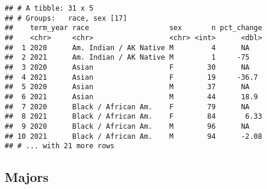 \documentclass[]{article}
\newenvironment{Shaded}{\begin{snugshade}}{\end{snugshade}}
\newcommand{\CommentTok}[1]{\textcolor[rgb]{0.56,0.35,0.01}{\textit{#1}}}
\newcommand{\DataTypeTok}[1]{\textcolor[rgb]{0.13,0.29,0.53}{#1}}
\newcommand{\DecValTok}[1]{\textcolor[rgb]{0.00,0.00,0.81}{#1}}
\newcommand{\KeywordTok}[1]{\textcolor[rgb]{0.13,0.29,0.53}{\textbf{#1}}}
\newcommand{\NormalTok}[1]{#1}
\newcommand{\OperatorTok}[1]{\textcolor[rgb]{0.81,0.36,0.00}{\textbf{#1}}}
\newcommand{\OtherTok}[1]{\textcolor[rgb]{0.56,0.35,0.01}{#1}}
\newcommand{\StringTok}[1]{\textcolor[rgb]{0.31,0.60,0.02}{#1}}
\begin{document}
\begin{Shaded}
\end{Shaded}

\begin{verbatim}
## # A tibble: 31 x 5
## # Groups:   race, sex [17]
##    term_year race                   sex       n pct_change
##    <chr>     <chr>                  <chr> <int>      <dbl>
##  1 2020      Am. Indian / AK Native M         4      NA   
##  2 2021      Am. Indian / AK Native M         1     -75   
##  3 2020      Asian                  F        30      NA   
##  4 2021      Asian                  F        19     -36.7 
##  5 2020      Asian                  M        37      NA   
##  6 2021      Asian                  M        44      18.9 
##  7 2020      Black / African Am.    F        79      NA   
##  8 2021      Black / African Am.    F        84       6.33
##  9 2020      Black / African Am.    M        96      NA   
## 10 2021      Black / African Am.    M        94      -2.08
## # ... with 21 more rows
\end{verbatim}

\hypertarget{majors}{%
\subsection{Majors}\label{majors}}
\end{document}
